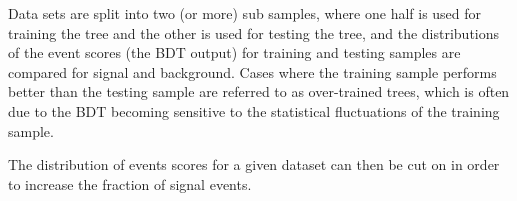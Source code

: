 Data sets are split into two (or more) sub samples, where one half is used for training the tree and the other is used for testing the tree, and the distributions of the event scores (the BDT output) for training and testing samples are compared for signal and background. Cases where the training sample performs better than the testing sample are referred to as over-trained trees, which is often due to the BDT becoming sensitive to the statistical fluctuations of the training sample.%

 The distribution of events scores for a given dataset can then be cut on in order to increase the fraction of signal events.






